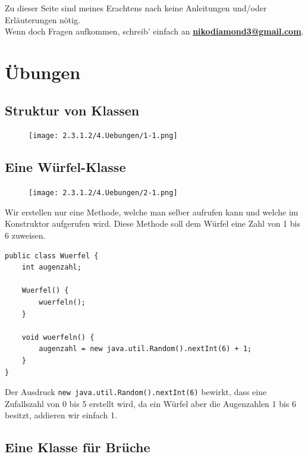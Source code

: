 \documentclass{scrartcl}   %
\begin{document}
Zu dieser Seite sind meines Erachtens nach keine Anleitungen und/oder Erläuterungen nötig.\\
Wenn doch Fragen aufkommen, schreib' einfach an \textbf{\href{mailto:nikodiamond3@gmail.com}{nikodiamond3@gmail.com}}.

\newpage

\section{Übungen}

\subsection{Struktur von Klassen}

\begin{figure}[ht]
	\centering
	\texttt{[image: 2.3.1.2/4.Uebungen/1-1.png]}
\end{figure}

\subsection{Eine Würfel-Klasse}

\begin{figure}[ht]
	\centering
	\texttt{[image: 2.3.1.2/4.Uebungen/2-1.png]}
\end{figure}

Wir erstellen nur eine Methode, welche man selber aufrufen kann und welche im Konstruktor aufgerufen wird. Diese Methode soll dem Würfel eine Zahl von 1 bis 6 zuweisen.

\newpage

\begin{lstlisting}
public class Wuerfel {
    int augenzahl;
    
    Wuerfel() {
        wuerfeln();
    }
    
    void wuerfeln() {
        augenzahl = new java.util.Random().nextInt(6) + 1;
    }
}
\end{lstlisting}

Der Ausdruck \texttt{new  java.util.Random().nextInt(6)} bewirkt, dass eine Zufallszahl von 0 bis 5 erstellt wird, da ein Würfel aber die Augenzahlen 1 bis 6 besitzt, addieren wir einfach 1.

\subsection{Eine Klasse für Brüche}
\end{document}
